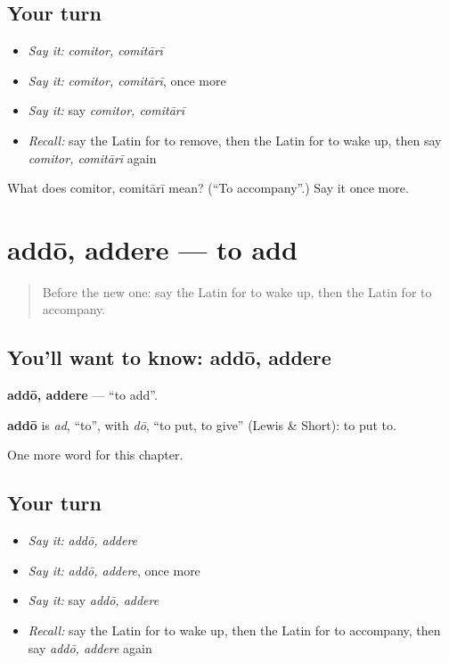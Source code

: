 \subsection*{Your turn}
\begin{itemize}
\raggedright
  \item \emph{Say it:} \emph{comitor, comitārī}
  \item \emph{Say it:} \emph{comitor, comitārī}, once more
  \item \emph{Say it:} say \emph{comitor, comitārī}
  \item \emph{Recall:} say the Latin for to remove, then the Latin for to wake up, then say \emph{comitor, comitārī} again
\end{itemize}

\begin{tcolorbox}[breakable,colback=teal!4,colframe=teal!35!black,title={Before you move on}]
What does comitor, comitārī mean? (\textquotedblleft{}To accompany\textquotedblright{}.) Say it once more.
\end{tcolorbox}
\section[addō, addere]{addō, addere — to add}

\label{lesson:LA-C230-addo}



\begin{quote}
Before the new one: say the Latin for to wake up, then the Latin for to accompany.
\end{quote}

\subsection*{You'll want to know: addō, addere}
\textbf{addō, addere} — \textquotedblleft{}to add\textquotedblright{}.

\begin{cousinweb}
\textbf{addō} is \emph{ad}, \textquotedblleft{}to\textquotedblright{}, with \emph{dō}, \textquotedblleft{}to put, to give\textquotedblright{} (Lewis \& Short): to put to.
\end{cousinweb}

\begin{grammarlens}[title={What you've built}]
One more word for this chapter.
\end{grammarlens}

\subsection*{Your turn}
\begin{itemize}
\raggedright
  \item \emph{Say it:} \emph{addō, addere}
  \item \emph{Say it:} \emph{addō, addere}, once more
  \item \emph{Say it:} say \emph{addō, addere}
  \item \emph{Recall:} say the Latin for to wake up, then the Latin for to accompany, then say \emph{addō, addere} again
\end{itemize}

